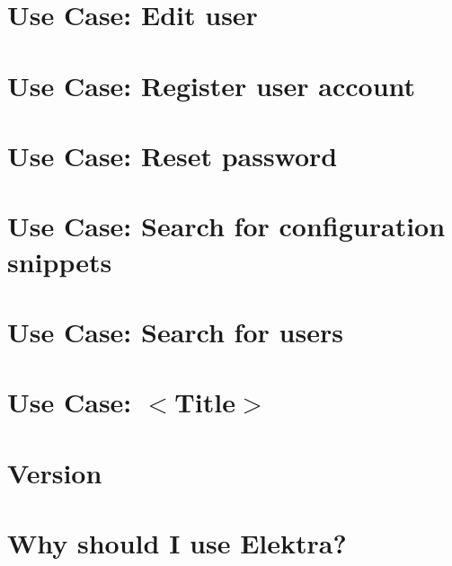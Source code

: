 \documentclass[twoside]{book}
\newcommand{\+}{\discretionary{\mbox{\scriptsize$\hookleftarrow$}}{}{}}
\begin{document}
\chapter{Use Case\+: Edit user}
\label{md_doc_usecases_snippet_sharing_UC_edit_user}
\hypertarget{md_doc_usecases_snippet_sharing_UC_edit_user}{}

\chapter{Use Case\+: Register user account}
\label{md_doc_usecases_snippet_sharing_UC_register}
\hypertarget{md_doc_usecases_snippet_sharing_UC_register}{}

\chapter{Use Case\+: Reset password}
\label{md_doc_usecases_snippet_sharing_UC_reset_password}
\hypertarget{md_doc_usecases_snippet_sharing_UC_reset_password}{}

\chapter{Use Case\+: Search for configuration snippets}
\label{md_doc_usecases_snippet_sharing_UC_search_snippet}
\hypertarget{md_doc_usecases_snippet_sharing_UC_search_snippet}{}

\chapter{Use Case\+: Search for users}
\label{md_doc_usecases_snippet_sharing_UC_search_user}
\hypertarget{md_doc_usecases_snippet_sharing_UC_search_user}{}

\chapter{Use Case\+: $<$Title$>$}
\label{md_doc_usecases_TEMPLATE}
\hypertarget{md_doc_usecases_TEMPLATE}{}

\chapter{Version}
\label{doc_VERSION_md}
\hypertarget{doc_VERSION_md}{}

\chapter{Why should I use Elektra?}
\label{doc_WHY_md}
\hypertarget{doc_WHY_md}{}

\end{document}
